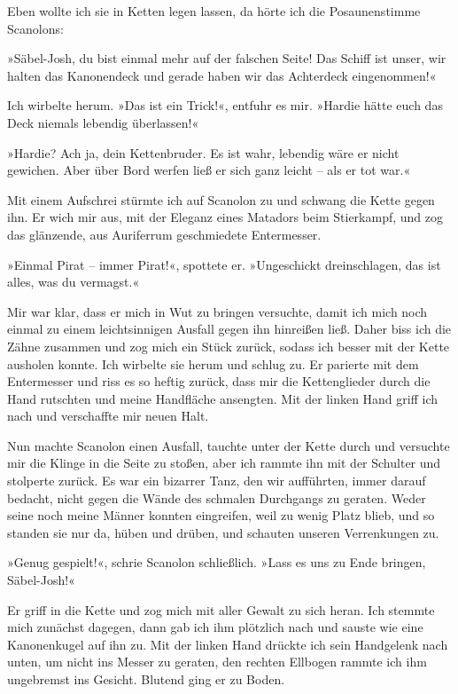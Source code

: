 Eben wollte ich sie in Ketten legen lassen, da hörte ich die
Posaunenstimme Scanolons:

»Säbel-Josh, du bist einmal mehr auf der falschen Seite! Das Schiff
ist unser, wir halten das Kanonendeck und gerade haben wir das
Achterdeck eingenommen!«

Ich wirbelte herum. »Das ist ein Trick!«, entfuhr es mir. »Hardie
hätte euch das Deck niemals lebendig überlassen!«

»Hardie? Ach ja, dein Kettenbruder. Es ist wahr, lebendig wäre er
nicht gewichen. Aber über Bord werfen ließ er sich ganz leicht –
als er tot war.«

Mit einem Aufschrei stürmte ich auf Scanolon zu und schwang die
Kette gegen ihn. Er wich mir aus, mit der Eleganz eines Matadors
beim Stierkampf, und zog das glänzende, aus Auriferrum geschmiedete
Entermesser.

»Einmal Pirat – immer Pirat!«, spottete er. »Ungeschickt
dreinschlagen, das ist alles, was du vermagst.«

\bigpar

Mir war klar, dass er mich in Wut zu bringen versuchte, damit ich
mich noch einmal zu einem leichtsinnigen Ausfall gegen ihn
hinreißen ließ. Daher biss ich die Zähne zusammen und zog mich ein
Stück zurück, sodass ich besser mit der Kette ausholen konnte. Ich
wirbelte sie herum und schlug zu. Er parierte mit dem Entermesser
und riss es so heftig zurück, dass mir die Kettenglieder durch die
Hand rutschten und meine Handfläche ansengten. Mit der linken Hand
griff ich nach und verschaffte mir neuen Halt.

Nun machte Scanolon einen Ausfall, tauchte unter der Kette durch
und versuchte mir die Klinge in die Seite zu stoßen, aber ich
rammte ihn mit der Schulter und stolperte zurück. Es war ein
bizarrer Tanz, den wir aufführten, immer darauf bedacht, nicht
gegen die Wände des schmalen Durchgangs zu geraten. Weder seine
noch meine Männer konnten eingreifen, weil zu wenig Platz blieb,
und so standen sie nur da, hüben und drüben, und schauten unseren
Verrenkungen zu.

»Genug gespielt!«, schrie Scanolon schließlich. »Lass es uns zu
Ende bringen, Säbel-Josh!«

Er griff in die Kette und zog mich mit aller Gewalt zu sich heran.
Ich stemmte mich zunächst dagegen, dann gab ich ihm plötzlich nach
und sauste wie eine Kanonenkugel auf ihn zu. Mit der linken Hand
drückte ich sein Handgelenk nach unten, um nicht ins Messer zu
geraten, den rechten Ellbogen rammte ich ihm ungebremst ins
Gesicht. Blutend ging er zu Boden.

